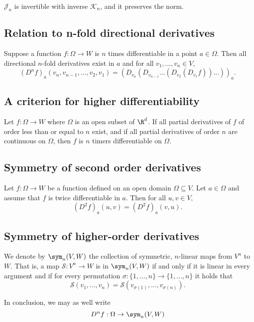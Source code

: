 \begin{proposition}
    $\mathcal J_n$ is invertible with inverse $\mathcal K_n$, and it preserves the norm.
\end{proposition}

\subsection{Relation to n-fold directional derivatives}
\begin{proposition}
    Suppose a function $f: \Omega \to W$ is $n$ times differentiable in a point
    $a \in \Omega$. Then all directional $n$-fold derivatives exist in $a$ and for all
    $v_1,\dots,v_n \in V$,
    $$(D^nf)_a(v_n,v_{n-1},\dots,v_2,v_1) = (D_{v_n}(D_{v_{n-1}}\dots(D_{v_2}(D_{v_1}f))\dots))_a.$$
\end{proposition}

\subsection{A criterion for higher differentiability}
\begin{theorem}
    Let $f:\Omega \to W$ where $\Omega$ is an open subset of $\R^d$. If all partial derivatives
    of $f$ of order less than or equal to $n$ exist, and if all partial derivatives of order $n$
    are continuous on $\Omega$, then $f$ is $n$ timers differentiable on $\Omega$.
\end{theorem}

\subsection{Symmetry of second order derivatives}
\begin{lemma}
    Let $f:\Omega \to W$ be a function defined on an open domain $\Omega \subseteq V$. Let $a\in\Omega$
    and assume that $f$ is twice differentiable in $a$. Then for all $u,v \in V,$
    $$(D^2f)_a(u,v) = (D^2f)_a(v,u).$$
\end{lemma}

\subsection{Symmetry of higher-order derivatives}
\begin{definition}
    We denote by $\sym_n(V,W)$ the collection of symmetric, $n$-linear maps from $V^n$ to $W$. 
    That is, a map $\mathcal S:V^n \to W$ is in $\sym_n(V,W)$ if and only if it is linear in
    every argument and if for every permutation $\sigma:\{1,\dots,n\}\to\{1,\dots,n\}$ it holds that
    $$\mathcal S(v_1,\dots,v_n) = \mathcal S(v_{\sigma(1)},\dots,v_{\sigma(n)}).$$

    In conclusion, we may as well write
    $$D^nf:\Omega \to \sym_n(V,W)$$
\end{definition}
